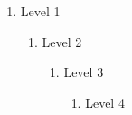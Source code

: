 \documentclass[]{article}
\begin{document}
 \begin{enumerate}
     \item Level 1
     \begin{enumerate}
         \item Level 2
         \begin{enumerate}
             \item Level 3
             \begin{enumerate}
                 \item 
                 Level 4
             \end{enumerate}
         \end{enumerate}
     \end{enumerate}
 \end{enumerate}
\end{document}
